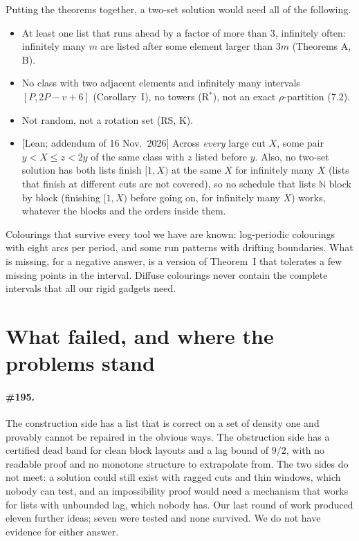 \documentclass[11pt,letterpaper]{article}
\newcommand{\N}{\mathbb{N}}
\newcommand{\st}[1]{\textnormal{\textsf{\small[#1]}}}
\begin{document}
Putting the theorems together, a two-set solution would need all of the following.
\begin{itemize}
\item At least one list that runs ahead by a factor of more than 3, infinitely often: infinitely many $m$
are listed after some element larger than $3m$ (Theorems A, B).
\item No class with two adjacent elements and infinitely many intervals $[P, 2P-v+6]$ (Corollary~I), no
towers (R$^*$), not an exact $\rho$-partition (7.2).
\item Not random, not a rotation set (RS, K).
\item \st{Lean; addendum of 16 Nov.\ 2026} Across \emph{every} large cut $X$, some pair $y < X \le z < 2y$ of the same
class with $z$ listed before $y$. Also, no two-set solution has both lists finish $[1,X)$ at the same $X$ for
infinitely many $X$ (lists that finish at different cuts are not covered), so no schedule that lists $\N$ block by block (finishing $[1,X)$ before
going on, for infinitely many $X$) works, whatever the blocks and the orders inside them.
\end{itemize}
Colourings that survive every tool we have are known: log-periodic colourings with eight arcs per period,
and some run patterns with drifting boundaries. What is missing, for a negative answer, is a version of
Theorem~I that tolerates a few missing points in the interval. Diffuse colourings never contain the complete
intervals that all our rigid gadgets need.

\section{What failed, and where the problems stand}\label{sec:open}

\paragraph{\#195.} The construction side has a list that is correct on a set of density one and provably
cannot be repaired in the obvious ways. The obstruction side has a certified dead band for clean block
layouts and a lag bound of $9/2$, with no readable proof and no monotone structure to extrapolate from. The
two sides do not meet: a solution could still exist with ragged cuts and thin windows, which nobody can
test, and an impossibility proof would need a mechanism that works for lists with unbounded lag, which
nobody has. Our last round of work produced eleven further ideas; seven were tested and none survived. We do
not have evidence for either answer.
\end{document}
